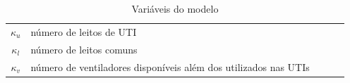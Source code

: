 \documentclass{article}
\begin{document}
\begin{table}[h]
\begin{tabular}{|c|p{7cm}|p{2cm}|l|l}
		$\kappa_u$     & número de leitos de UTI                                                               &                           &             &   \\ \cline{1-4}              
		$\kappa_l$     & número de leitos comuns                                                               &                           &             &   \\ \cline{1-4}              
		$\kappa_v$     & número de ventiladores disponíveis  além dos utilizados nas UTIs                    &                           &             &   \\ \cline{1-4}        
	\end{tabular}
	\caption{ Variáveis do modelo}
\end{table}

	
	
	
% 
% 
\end{document}
